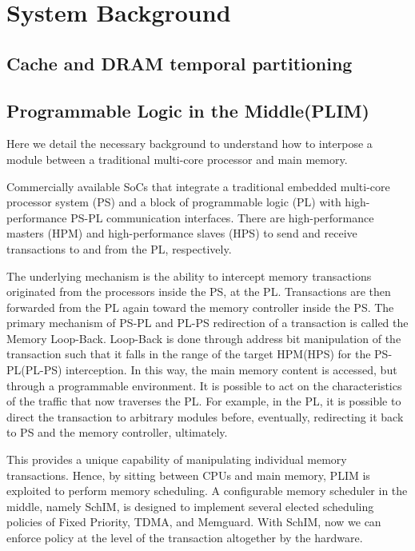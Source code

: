 \section{System Background}
\subsection{Cache and DRAM temporal partitioning}

\subsection{Programmable Logic in the Middle(PLIM)}

Here we detail the necessary background to understand how to interpose a module between a traditional multi-core processor and main memory.

Commercially available SoCs that integrate a traditional embedded multi-core processor system (PS) and a block of programmable logic (PL) with high-performance PS-PL communication interfaces. There are high-performance masters (HPM) and high-performance slaves (HPS) to send and receive transactions to and from the PL, respectively.

The underlying mechanism is the ability to intercept memory transactions originated from the processors inside the PS, at the PL. Transactions are then forwarded from the PL again toward the memory controller inside the PS. The primary mechanism of PS-PL and PL-PS redirection of a transaction is called the Memory Loop-Back. Loop-Back is done through address bit manipulation of the transaction such that it falls in the range of the target HPM(HPS) for the PS-PL(PL-PS) interception. In this way, the main memory content is accessed, but through a programmable environment. It is possible to act on the characteristics of the traffic that now traverses the PL. For example, in the PL, it is possible to direct the transaction to arbitrary modules before, eventually, redirecting it back to PS and the memory controller, ultimately.

This provides a unique capability of manipulating individual memory transactions. Hence, by sitting between CPUs and main memory, PLIM is exploited to perform memory scheduling. A configurable memory scheduler in the middle, namely SchIM, is designed to implement several elected scheduling policies of Fixed Priority, TDMA, and Memguard. With
SchIM, now we can enforce policy at the level of the transaction altogether by the hardware.



